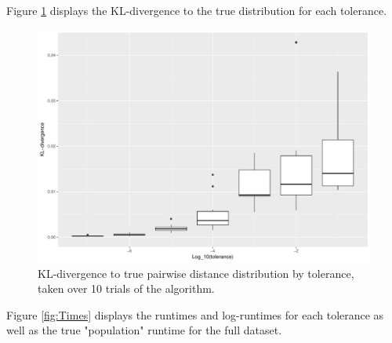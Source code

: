 \documentclass{article}
\begin{document}
Figure \ref{fig:Divergences} displays the KL-divergence to the true distribution for each tolerance.
\begin{figure}
    \includegraphics[width=\linewidth]{Figures/PairwiseDistance/div_by_tol.pdf}
    \caption{KL-divergence to true pairwise distance distribution by tolerance, taken over 10 trials of the algorithm.}
    \label{fig:Divergences}
\end{figure}
Figure \ref{fig:Times} displays the runtimes and log-runtimes for each tolerance as well as the true "population" runtime for the full dataset.
\end{document}
